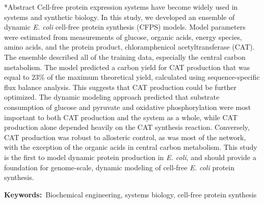 \documentclass[12pt]{article}
\makeatletter
\renewcommand\section{\@startsection
	{subsection}{2}{0mm}
	{-0.2in}
	{0.05\baselineskip}
	{\normalfont\large\bfseries}}
\makeatother
\begin{document}
\section*{Abstract}
Cell-free protein expression systems have become widely used in systems and synthetic biology.
In this study, we developed an ensemble of dynamic \textit{E. coli} cell-free protein synthesis (CFPS) models.
Model parameters were estimated from measurements of glucose, organic acids, energy species, amino acids, and the protein product, chloramphenicol acetyltransferase (CAT).
The ensemble described all of the training data, especially the central carbon metabolism.
The model predicted a carbon yield for CAT production that was equal to 23\% of the maximum theoretical yield, calculated using sequence-specific flux balance analysis.
This suggests that CAT production could be further optimized.
The dynamic modeling approach predicted that substrate consumption of glucose and pyruvate and oxidative phosphorylation were most important to both CAT production and the system as a whole, while CAT production alone depended heavily on the CAT synthesis reaction.
Conversely, CAT production was robust to allosteric control, as was most of the network, with the exception of the organic acids in central carbon metabolism.
This study is the first to model dynamic protein production in \textit{E. coli}, and should provide a foundation for genome-scale,
dynamic modeling of cell-free \textit{E. coli} protein synthesis.

\vspace{0.1in}
{\noindent \textbf{Keywords:}~Biochemical engineering, systems biology, cell-free protein synthesis}

\pagebreak

\setcounter{page}{1}


\linenumbers
\end{document}
